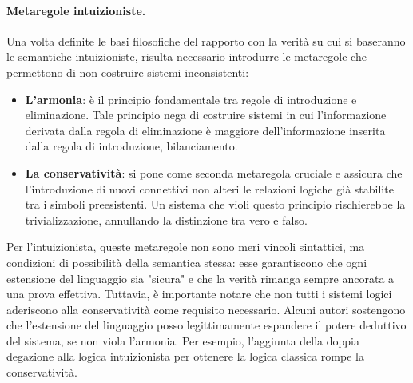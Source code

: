 \paragraph{Metaregole intuizioniste.}
Una volta definite le basi filosofiche del rapporto con la verità su cui si baseranno le semantiche intuizioniste, 
risulta necessario introdurre le metaregole che permettono di non costruire sistemi inconsistenti:
\begin{itemize}
    \item 
        \textbf{L'armonia}: è il principio fondamentale tra regole di introduzione e eliminazione. 
        Tale principio nega di costruire sistemi in cui l'informazione derivata dalla regola 
        di eliminazione è maggiore dell'informazione inserita dalla regola di introduzione, bilanciamento.
    \item 
        \textbf{La conservatività}: si pone come seconda metaregola cruciale e assicura che l'introduzione di nuovi 
        connettivi non alteri le relazioni logiche già stabilite tra i simboli preesistenti. Un sistema che 
        violi questo principio rischierebbe la trivializzazione, annullando la distinzione tra vero e falso.
\end{itemize}
Per l'intuizionista, queste metaregole non sono meri vincoli sintattici, ma condizioni di possibilità della semantica stessa: esse garantiscono che ogni estensione del linguaggio 
sia "sicura" e che la verità rimanga sempre ancorata a una prova effettiva. Tuttavia, è importante notare che non tutti i sistemi logici aderiscono alla conservatività come requisito 
necessario. Alcuni autori sostengono che l'estensione del linguaggio posso legittimamente espandere il potere deduttivo del sistema, se non viola l'armonia. Per esempio, l'aggiunta
della doppia degazione alla logica intuizionista per ottenere la logica classica rompe la conservatività.

